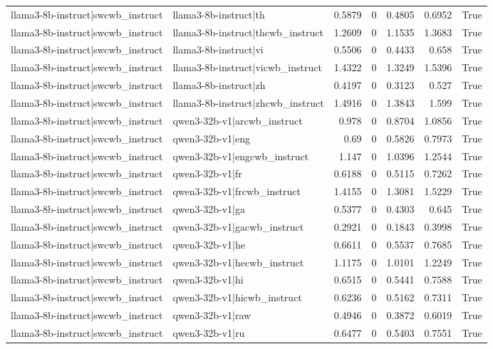 \begin{table}
\begin{tabular}{l l r r r r l}
llama3-8b-instruct|swcwb_instruct & llama3-8b-instruct|th & 0.5879 & 0 & 0.4805 & 0.6952 & True \\
llama3-8b-instruct|swcwb_instruct & llama3-8b-instruct|thcwb_instruct & 1.2609 & 0 & 1.1535 & 1.3683 & True \\
llama3-8b-instruct|swcwb_instruct & llama3-8b-instruct|vi & 0.5506 & 0 & 0.4433 & 0.658 & True \\
llama3-8b-instruct|swcwb_instruct & llama3-8b-instruct|vicwb_instruct & 1.4322 & 0 & 1.3249 & 1.5396 & True \\
llama3-8b-instruct|swcwb_instruct & llama3-8b-instruct|zh & 0.4197 & 0 & 0.3123 & 0.527 & True \\
llama3-8b-instruct|swcwb_instruct & llama3-8b-instruct|zhcwb_instruct & 1.4916 & 0 & 1.3843 & 1.599 & True \\
llama3-8b-instruct|swcwb_instruct & qwen3-32b-v1|arcwb_instruct & 0.978 & 0 & 0.8704 & 1.0856 & True \\
llama3-8b-instruct|swcwb_instruct & qwen3-32b-v1|eng & 0.69 & 0 & 0.5826 & 0.7973 & True \\
llama3-8b-instruct|swcwb_instruct & qwen3-32b-v1|engcwb_instruct & 1.147 & 0 & 1.0396 & 1.2544 & True \\
llama3-8b-instruct|swcwb_instruct & qwen3-32b-v1|fr & 0.6188 & 0 & 0.5115 & 0.7262 & True \\
llama3-8b-instruct|swcwb_instruct & qwen3-32b-v1|frcwb_instruct & 1.4155 & 0 & 1.3081 & 1.5229 & True \\
llama3-8b-instruct|swcwb_instruct & qwen3-32b-v1|ga & 0.5377 & 0 & 0.4303 & 0.645 & True \\
llama3-8b-instruct|swcwb_instruct & qwen3-32b-v1|gacwb_instruct & 0.2921 & 0 & 0.1843 & 0.3998 & True \\
llama3-8b-instruct|swcwb_instruct & qwen3-32b-v1|he & 0.6611 & 0 & 0.5537 & 0.7685 & True \\
llama3-8b-instruct|swcwb_instruct & qwen3-32b-v1|hecwb_instruct & 1.1175 & 0 & 1.0101 & 1.2249 & True \\
llama3-8b-instruct|swcwb_instruct & qwen3-32b-v1|hi & 0.6515 & 0 & 0.5441 & 0.7588 & True \\
llama3-8b-instruct|swcwb_instruct & qwen3-32b-v1|hicwb_instruct & 0.6236 & 0 & 0.5162 & 0.7311 & True \\
llama3-8b-instruct|swcwb_instruct & qwen3-32b-v1|raw & 0.4946 & 0 & 0.3872 & 0.6019 & True \\
llama3-8b-instruct|swcwb_instruct & qwen3-32b-v1|ru & 0.6477 & 0 & 0.5403 & 0.7551 & True \\

\end{tabular}
\end{table}
